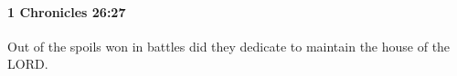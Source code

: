 
		\paragraph{1 Chronicles 26:27} %
			\label{1CHRONICLES-26-27}

			Out of the spoils won in battles did they dedicate to maintain the house of the LORD.


